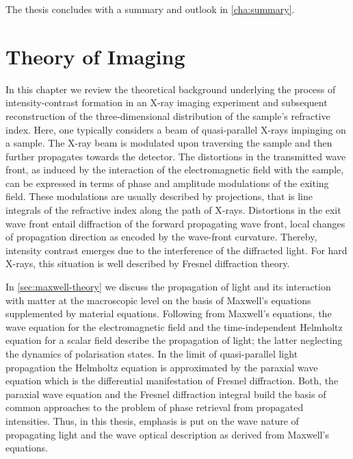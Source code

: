 \documentclass[
twoside,
openright,
titlepage,
numbers=noenddot,
headinclude,
fleqn,
a4paper,
footinclude=true,
cleardoublepage=empty,
abstractoff,
BCOR=5mm,
paper=a4,
fontsize=11pt,
british,ngerman,american,
]{scrreprt}
\begin{document}
The thesis concludes with a summary and outlook in \cref{cha:summary}.

\chapter{Theory of Imaging}
\label{cha:theory}

In this chapter we review the theoretical background underlying the
process of intensity-contrast formation in an X-ray imaging experiment
and subsequent reconstruction of the three-dimensional distribution of
the sample's refractive index.  Here, one typically considers a beam
of quasi-parallel X-rays impinging on a sample.  The X-ray beam is
modulated upon traversing the sample and then further propagates
towards the detector.  The distortions in the transmitted wave front,
as induced by the interaction of the electromagnetic field with the
sample, can be expressed in terms of phase and amplitude modulations
of the exiting field.  These modulations are usually described by
projections, that is line integrals of the refractive index along the
path of X-rays.  Distortions in the exit wave front entail diffraction
of the forward propagating wave front, \ie{} local changes of
propagation direction as encoded by the wave-front curvature.
Thereby, intensity contrast emerges due to the interference of the
diffracted light.  For hard X-rays, this situation is well described
by Fresnel diffraction theory.

In \cref{sec:maxwell-theory} we discuss the propagation of light and
its interaction with matter at the macroscopic level on the basis of
Maxwell's equations supplemented by material equations.  Following
from Maxwell's equations, the wave equation for the electromagnetic
field and the time-independent Helmholtz equation for a scalar field
describe the propagation of light; the latter neglecting the dynamics
of polarisation states.  In the limit of quasi-parallel light
propagation the Helmholtz equation is approximated by the paraxial
wave equation which is the differential manifestation of Fresnel
diffraction.  Both, the paraxial wave equation and the Fresnel
diffraction integral build the basis of common approaches to the
problem of phase retrieval from propagated intensities.  Thus, in this
thesis, emphasis is put on the wave nature of propagating light and
the wave optical description as derived from Maxwell's equations.
\end{document}
